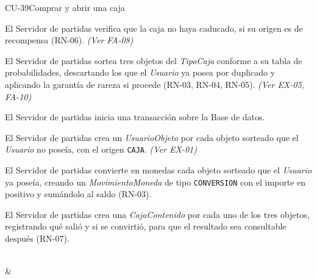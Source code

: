 \begin{fichacu}{CU-39}{Comprar y abrir una caja}
{\begin{cuenum}[start=17]
      \item El Servidor de partidas verifica que la caja no haya caducado, si su origen es de recompensa (\mbox{RN-06}). \textit{(Ver \mbox{FA-08})}
      \item El Servidor de partidas sortea tres objetos del \textit{TipoCaja} conforme a su tabla de probabilidades, descartando los que el \textit{Usuario} ya posea por duplicado y aplicando la garantía de rareza si procede (\mbox{RN-03}, \mbox{RN-04}, \mbox{RN-05}). \textit{(Ver \mbox{EX-05}, \mbox{FA-10})}
      \item El Servidor de partidas inicia una transacción sobre la Base de datos.
      \item El Servidor de partidas crea un \textit{UsuarioObjeto} por cada objeto sorteado que el \textit{Usuario} no poseía, con el origen \texttt{CAJA}. \textit{(Ver \mbox{EX-01})}
      \item El Servidor de partidas convierte en monedas cada objeto sorteado que el \textit{Usuario} ya poseía, creando un \textit{MovimientoMoneda} de tipo \texttt{CONVERSION} con el importe en positivo y sumándolo al saldo (\mbox{RN-03}).
      \item El Servidor de partidas crea una \textit{CajaContenido} por cada uno de los tres objetos, registrando qué salió y si se convirtió, para que el resultado sea consultable después (\mbox{RN-07}).
    \end{cuenum}} \\
   & 
\end{fichacu}
